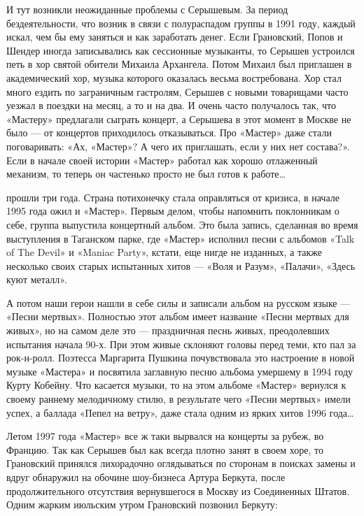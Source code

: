 \documentclass[10pt, twoside]{book}
\begin{document}
И тут возникли неожиданные проблемы с Серышевым. За период бездеятельности, что возник в связи с полураспадом группы в
1991 году, каждый искал, чем бы ему заняться и как заработать денег. Если Грановский, Попов и Шендер иногда записывались
как сессионные музыканты, то Серышев устроился петь в хор святой обители Михаила Архангела. Потом Михаил был приглашен в
академический хор, музыка которого оказалась весьма востребована. Хор стал много ездить по заграничным гастролям,
Серышев с новыми товарищами часто уезжал в поездки на месяц, а то и на два. И очень часто получалось так, что «Мастеру»
предлагали сыграть концерт, а Серышева в этот момент в Москве не было — от концертов приходилось отказываться. Про
«Мастер» даже стали поговаривать: «Ах, «Мастер»? А чего их приглашать, если у них нет состава?». Если в начале своей
истории «Мастер» работал как хорошо отлаженный механизм, то теперь он частенько просто не был готов к работе\ldots

 прошли три года. Страна потихонечку стала оправляться от кризиса, в начале 1995 года ожил и «Мастер». Первым
делом, чтобы напомнить поклонникам о себе, группа выпустила концертный альбом. Это была запись, сделанная во время
выступления в Таганском парке, где «Мастер» исполнил песни с альбомов «Talk of The Devil» и «Maniac Party», кстати, еще
нигде не изданных, а также несколько своих старых испытанных хитов — «Воля и Разум», «Палачи», «Здесь куют металл».

А потом наши герои нашли в себе силы и записали альбом на русском языке — «Песни мертвых». Полностью этот альбом имеет
название «Песни мертвых для живых», но на самом деле это — праздничная песнь живых, преодолевших испытания начала 90-х.
При этом живые склоняют головы перед теми, кто пал за рок-н-ролл. Поэтесса Маргарита Пушкина почувствовала это
настроение в новой музыке «Мастера» и посвятила заглавную песню альбома умершему в 1994 году Курту Кобейну. Что касается
музыки, то на этом альбоме «Мастер» вернулся к своему раннему мелодичному стилю, в результате чего «Песни мертвых» имели
успех, а баллада «Пепел на ветру», даже стала одним из ярких хитов 1996 года\ldots

Летом 1997 года «Мастер» все ж таки вырвался на концерты за рубеж, во Францию. Так как Серышев был как всегда плотно
занят в своем хоре, то Грановский принялся лихорадочно оглядываться по сторонам в поисках замены и вдруг обнаружил на
обочине шоу-бизнеса Артура Беркута, после продолжительного отсутствия вернувшегося в Москву из Соединенных Штатов. Одним
жарким июльским утром Грановский позвонил Беркуту:
\end{document}
